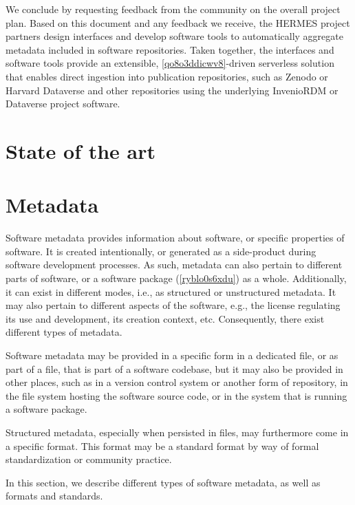 \documentclass{article}
\begin{document}
We conclude by requesting feedback from the community on the overall project plan. Based on this document and any feedback we receive, the HERMES project partners design interfaces and develop software tools to automatically aggregate metadata included in software repositories. Taken together, the interfaces and software tools provide an extensible, \ref{qo8o3ddicwv8}-driven serverless solution that enables direct ingestion into publication repositories, such as Zenodo or Harvard Dataverse and other repositories using the underlying InvenioRDM or Dataverse project software. 



\section{State of the art}\label{ut9zhy3}


\section{Metadata}\label{w18i1t4buieu}
Software metadata provides information about software, or specific properties of software. It is created intentionally, or generated as a side-product during software development processes. As such, metadata can also pertain to different parts of software, or a software package (\ref{ryblo0s6xdu}) as a whole. Additionally, it can exist in different modes, i.e., as structured or unstructured metadata. It may also pertain to different aspects of the software, e.g., the license regulating its use and development, its creation context, etc. Consequently, there exist different types of metadata.

Software metadata may be provided in a specific form in a dedicated file, or as part of a file, that is part of a software codebase, but it may also be provided in other places, such as in a version control system or another form of repository, in the file system hosting the software source code, or in the system that is running a software package.  

Structured metadata, especially when persisted in files, may furthermore come in a specific format. This format may be a standard format by way of formal standardization or community practice.

In this section, we describe different types of software metadata, as well as formats and standards.
\end{document}
